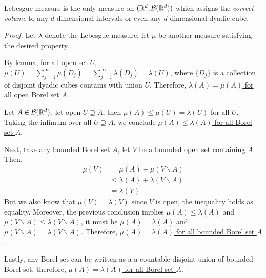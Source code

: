 \documentclass[11pt]{article}
\begin{document}
	\begin{proposition}
		Lebesgue measure is the only measure on $(\mathbb{R}^d, \mathcal{{B}}(\mathbb{R}^d))$ which assigns the \emph{correct volume} to any $d$-dimensional intervals or even any $d$-dimensional dyadic cube.
		\begin{proof}
			Let $\lambda$ denote the Lebesgue measure, let $\mu$ be another measure satisfying the desired property.
			
			By lemma, for all open set $U$, $\mu(U) = \sum_{j=1}^\infty \mu(D_j) = \sum_{j=1}^\infty \lambda(D_j) = \lambda(U)$, where $\{D_j\}$ is a collection of disjoint dyadic cubes contains with union $U$.
			Therefore, \ul{$\lambda(A) = \mu(A)$ for all open Borel set $A$}.
			
			Let $A \in \mathcal{{B}}(\mathbb{R}^d)$, let open $U \supseteq A$, then $\mu(A) \leq \mu(U) = \lambda(U)$ for all $U$.
			Taking the infimum over all $U \supseteq A$, we conclude \ul{$\mu(A) \leq \lambda(A)$ for all Borel set $A$}.

			Next, take any \ul{bounded} Borel set $A$, let $V$ be a bounded open set containing $A$. Then,
			\begin{align}
				\mu(V) &= \mu(A) + \mu(V \backslash A) \\
				&\leq \lambda(A) + \lambda(V \backslash A) \\
				&= \lambda(V)
			\end{align}
			But we also know that $\mu(V) = \lambda(V)$ since $V$ is open, the inequality holds as equality. Moreover, the previous conclusion implies $\mu(A) \leq \lambda(A)$ and $\mu(V \backslash A) \leq \lambda(V \backslash A)$, it must be $\mu(A) = \lambda(A)$ and $\mu(V \backslash A) = \lambda(V \backslash A)$. Therefore, \ul{$\mu(A) = \lambda(A)$ for all bounded Borel set $A$}.
			
			Lastly, any Borel set can be written as a a countable disjoint union of bounded Borel set, therefore, \ul{$\mu(A) = \lambda(A)$ for all Borel set $A$}.
		\end{proof}
	\end{proposition}
	
\end{document}
